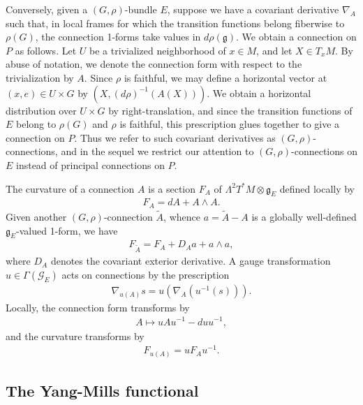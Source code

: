 \documentclass[12pt]{amsart}
\renewcommand{\1}{{\mathbf 1}}
\newcommand{\gothg}{{\mathfrak g}}
\theoremstyle{others}
\numberwithin{equation}{section}
\begin{document}
Conversely, given a \((G, \rho)\)-bundle \(E\), suppose we have a covariant derivative $\nabla_A$ such that, in local frames for which the transition functions belong fiberwise to $\rho(G)$, the connection 1-forms take values in $d\rho(\gothg)$. We obtain a connection on \(P\) as follows. Let \(U\) be a trivialized neighborhood of \(x \in M\), and let \(X \in T_xM\). By abuse of notation, we denote the connection form with respect to the trivialization by \(A.\) Since \(\rho\) is faithful, we may define a horizontal vector at \((x, e) \in U \times G\) by \((X, (d\rho)^{-1}(A(X)) )\). We obtain a horizontal distribution over \(U \times G\) by right-translation, and since the transition functions of \(E\) belong to \(\rho(G)\) and \(\rho\) is faithful, this prescription glues together to give a connection on \(P\). Thus we refer to such covariant derivatives as \((G, \rho)\)-connections, and in the sequel we restrict our attention to \((G, \rho)\)-connections on \(E\) instead of principal connections on \(P\). \par 
The curvature of a connection \(A\) is a section \(F_A\) of \(\Lambda^2T^\ast M \otimes \mathfrak{g}_E\) defined locally by 
\begin{align*}
    F_A = dA + A \wedge A.
\end{align*} Given another \((G, \rho)\)-connection \(\tilde{A}\), whence \(a = \tilde{A} - A\) is a globally well-defined \(\mathfrak{g}_E\)-valued 1-form, we have
\begin{align*}
    F_{\tilde{A}} = F_A + D_Aa + a \wedge a,
\end{align*}
where $D_A$ denotes the covariant exterior derivative.
A gauge transformation \(u \in \Gamma(\mathcal{G}_E)\) acts on connections by the prescription \begin{align*}
    \nabla_{u(A)} s = u(\nabla_A(u^{-1}(s))).
\end{align*} Locally, the connection form transforms by
\begin{align}\label{preliminaries:connectiontransformationlaw}
    A \mapsto u A u^{-1} - du u^{-1},
\end{align} and the curvature transforms by
\begin{align}\label{preliminaries:curvatureisgaugeequivariant}
    F_{u(A)} = uF_Au^{-1}.
\end{align}

\vspace{5mm}


\subsection{The Yang-Mills functional}
\end{document}
